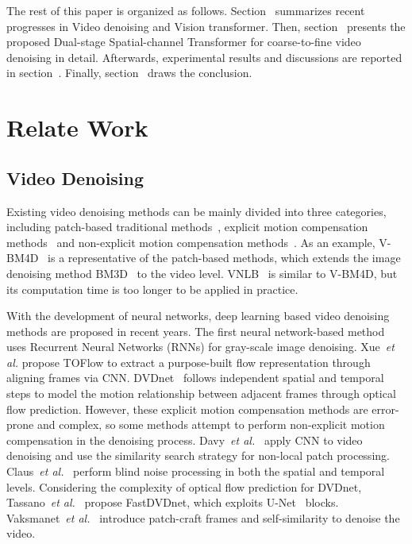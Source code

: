 \documentclass[journal]{IEEEtran}
\begin{document}
The rest of this paper is organized as follows. Section~\uppercase\expandafter{} summarizes recent progresses in Video denoising and Vision transformer. Then, section~\uppercase\expandafter{} presents the proposed Dual-stage Spatial-channel Transformer for coarse-to-fine video denoising in detail. Afterwards, experimental results and discussions are reported in section~\uppercase\expandafter{}. Finally, section~\uppercase\expandafter{} draws the conclusion.

\section{Relate Work}
\subsection{Video Denoising}
Existing video denoising methods can be mainly divided into three categories, including patch-based traditional methods~\cite{Maggioni2012VideoDD,Arias2017VideoDV}, explicit motion compensation methods~\cite{xue2019video,Tassano2019DVDNETAF} and non-explicit motion compensation methods~\cite{Tassano2020FastDVDnetTR,claus2019videnn,Davy2018NonLocalVD}. As an example, V-BM4D~\cite{Maggioni2012VideoDD} is a representative of the patch-based methods, which extends the image denoising method BM3D~\cite{dabov2007image} to the video level. VNLB~\cite{Arias2017VideoDV} is similar to V-BM4D, but its computation time is too longer to be applied in practice. 

With the development of neural networks, deep learning based video denoising methods are proposed in recent years. The first neural network-based method~\cite{Chen.2016.DRv} uses Recurrent Neural Networks (RNNs) for gray-scale image denoising. Xue~\textit{et al.}\cite{xue2019video} propose TOFlow to extract a purpose-built flow representation through aligning frames via CNN. DVDnet~\cite{Tassano2019DVDNETAF} follows independent spatial and temporal steps to model the motion relationship between adjacent frames through optical flow prediction.
However, these explicit motion compensation methods are error-prone and complex, so some methods attempt to perform non-explicit motion compensation in the denoising process. Davy~\textit{et al.}~\cite{Davy2018NonLocalVD} apply CNN to video denoising and use the similarity search strategy for non-local patch processing.
Claus~\textit{et al.}~\cite{claus2019videnn} perform blind noise processing in both the spatial and temporal levels. Considering the complexity of optical flow prediction for DVDnet, Tassano~\textit{et al.}~\cite{Tassano2020FastDVDnetTR} propose FastDVDnet, which exploits U-Net~\cite{ronneberger2015u} blocks. Vaksmanet~\textit{et al.}~\cite{Vaksman_2021_ICCV} introduce patch-craft frames and self-similarity to denoise the video. 
\end{document}
